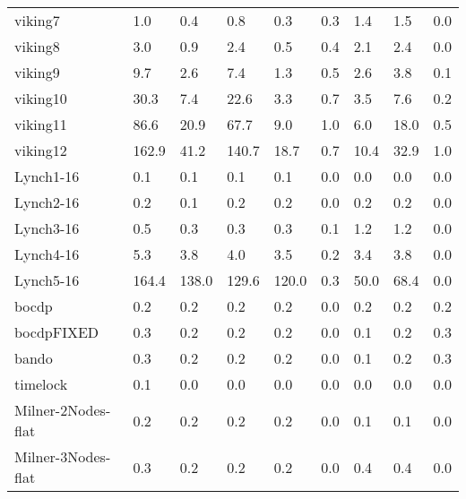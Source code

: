 \begin{table}
\begin{adjustbox}{max totalheight=\textheight}
\begin{tabular}{|l|llllllll|}
    viking7            & 1.0      & 0.4      & 0.8      & 0.3      & 0.3      & 1.4      & 1.5      & 0.0    \\
    viking8            & 3.0      & 0.9      & 2.4      & 0.5      & 0.4      & 2.1      & 2.4      & 0.0    \\
    viking9            & 9.7      & 2.6      & 7.4      & 1.3      & 0.5      & 2.6      & 3.8      & 0.1    \\
    viking10           & 30.3     & 7.4      & 22.6     & 3.3      & 0.7      & 3.5      & 7.6      & 0.2    \\
    viking11           & 86.6     & 20.9     & 67.7     & 9.0      & 1.0      & 6.0      & 18.0     & 0.5    \\
    viking12           & 162.9    & 41.2     & 140.7    & 18.7     & 0.7      & 10.4     & 32.9     & 1.0    \\ \hline
    Lynch1-16          & 0.1      & 0.1      & 0.1      & 0.1      & 0.0      & 0.0      & 0.0      & 0.0    \\
    Lynch2-16          & 0.2      & 0.1      & 0.2      & 0.2      & 0.0      & 0.2      & 0.2      & 0.0    \\
    Lynch3-16          & 0.5      & 0.3      & 0.3      & 0.3      & 0.1      & 1.2      & 1.2      & 0.0    \\
    Lynch4-16          & 5.3      & 3.8      & 4.0      & 3.5      & 0.2      & 3.4      & 3.8      & 0.0    \\
    Lynch5-16          & 164.4    & 138.0    & 129.6    & 120.0    & 0.3      & 50.0     & 68.4     & 0.0    \\ \hline
    bocdp              & 0.2      & 0.2      & 0.2      & 0.2      & 0.0      & 0.2      & 0.2      & 0.2    \\
    bocdpFIXED         & 0.3      & 0.2      & 0.2      & 0.2      & 0.0      & 0.1      & 0.2      & 0.3    \\
    bando              & 0.3      & 0.2      & 0.2      & 0.2      & 0.0      & 0.1      & 0.2      & 0.3    \\
    timelock           & 0.1      & 0.0      & 0.0      & 0.0      & 0.0      & 0.0      & 0.0      & 0.0    \\ \hline
    Milner-2Nodes-flat & 0.2      & 0.2      & 0.2      & 0.2      & 0.0      & 0.1      & 0.1      & 0.0    \\
    Milner-3Nodes-flat & 0.3      & 0.2      & 0.2      & 0.2      & 0.0      & 0.4      & 0.4      & 0.0    \\

\end{tabular}
\end{adjustbox}
\end{table}
